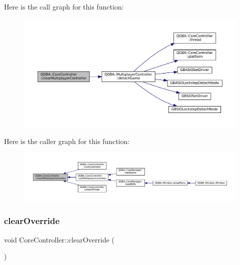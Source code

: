 Here is the call graph for this function\+:
\nopagebreak
\begin{figure}[H]
\begin{center}
\leavevmode
\includegraphics[width=350pt]{class_q_g_b_a_1_1_core_controller_a086e32f43e7e1bb5daada438af88017d_cgraph}
\end{center}
\end{figure}
Here is the caller graph for this function\+:
\nopagebreak
\begin{figure}[H]
\begin{center}
\leavevmode
\includegraphics[width=350pt]{class_q_g_b_a_1_1_core_controller_a086e32f43e7e1bb5daada438af88017d_icgraph}
\end{center}
\end{figure}
\mbox{\label{class_q_g_b_a_1_1_core_controller_ad0d1fcb85d6ecb3b24cf048576556604}} 
\subsubsection{\texorpdfstring{clear\+Override}{clearOverride}}
{\footnotesize\ttfamily void Core\+Controller\+::clear\+Override (\begin{DoxyParamCaption}{ }\end{DoxyParamCaption})\hspace{0.3cm}{\ttfamily [slot]}}

